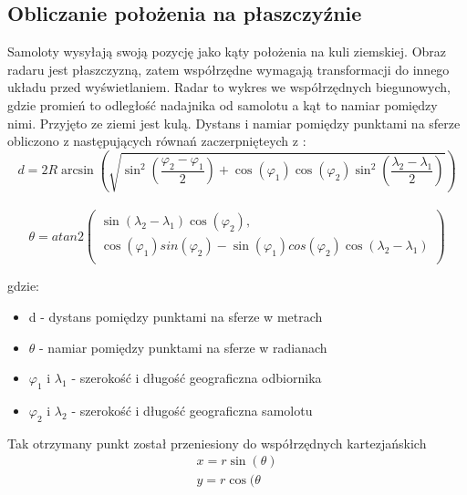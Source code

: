 \documentclass[eng,printmode]{mgr}
\begin{document}
\subsection*{Obliczanie położenia na płaszczyźnie}
Samoloty wysyłają swoją pozycję jako kąty położenia na kuli ziemskiej. Obraz radaru jest płaszczyzną, zatem współrzędne wymagają transformacji do innego układu przed wyświetlaniem. Radar to wykres we współrzędnych biegunowych, gdzie promień to odległość nadajnika od samolotu a kąt to namiar pomiędzy nimi. Przyjęto ze ziemi jest kulą.
Dystans i namiar pomiędzy punktami na sferze obliczono z następujących równań zaczerpnięteych z \cite{posCalc}:
\\


\begin{equation}
d = 2R\arcsin\left(\sqrt{\sin^2\left(\frac{\varphi_2 - \varphi_1}{2}\right)
+ \cos\left(\varphi_1\right)\cos\left(\varphi_2\right)
\sin^2\left(\frac{\lambda_2 - \lambda_1}{2}\right)}\right) \label{eq:dystans}
\end{equation}
\\

\begin{equation}
\renewcommand*{\arraystretch}{1.3}
\theta = atan2\left( \begin{array}{ll}
\sin\left(\lambda_2 - \lambda_1\right)\cos\left(\varphi_2\right),\\
\cos\left(\varphi_1\right)sin\left(\varphi_2\right)-
\sin\left(\varphi_1\right)cos\left(\varphi_2\right)
\cos\left(\lambda_2 - \lambda_1\right)\\
\end{array}
\right)
\end{equation}

gdzie:
\begin{itemize}
\item d - dystans pomiędzy punktami na sferze w metrach
\item $\theta$ - namiar pomiędzy punktami na sferze w radianach
\item $\varphi_1$ i $\lambda_1$ - szerokość i długość geograficzna odbiornika
\item $\varphi_2$ i $\lambda_2$ - szerokość i długość geograficzna samolotu
\end{itemize}
\vskip 0.5cm
Tak otrzymany punkt został przeniesiony do współrzędnych kartezjańskich
\begin{equation}
\renewcommand*{\arraystretch}{1.3}
\begin{array}{ll}
x = r\sin(\theta)\\
y = r\cos(\theta\\
\end{array}
\end{equation}
\\
\end{document}
